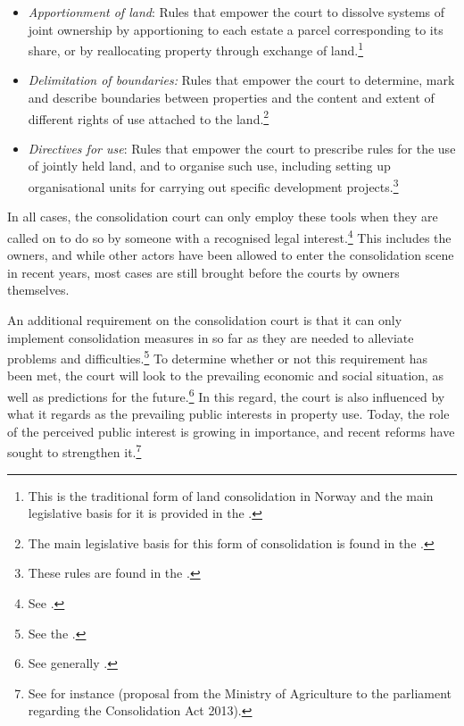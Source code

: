 \begin{itemize}
\item \emph{Apportionment of land}: Rules that empower the court to dissolve systems of joint ownership by apportioning to each estate a parcel corresponding to its share, or by reallocating property through exchange of land.\footnote{This is the traditional form of land consolidation in Norway and the main legislative basis for it is provided in the \cite[2 a)-b)]{lca79}.}
\item \emph{Delimitation of boundaries:} Rules that empower the court to determine, mark and describe boundaries between properties and the content and extent of different rights of use attached to the land.\footnote{The main legislative basis for this form of consolidation is found in the \cite[88]{lca79}.}
\item \emph{Directives for use}: Rules that empower the court to prescribe rules for the use of jointly held land, and to organise such use, including setting up organisational units for carrying out specific development projects.\footnote{These rules are found in the \cite[2 c)|34-35]{lca79}.}
\end{itemize}

In all cases, the consolidation court can only employ these tools when they are called on to do so by someone with a recognised legal interest.\footnote{See \cite[5]{lca79}.} This includes the owners, and while other actors have been allowed to enter the consolidation scene in recent years, most cases are still brought before the courts by owners themselves.

An additional requirement on the consolidation court is that it can only implement consolidation measures in so far as they are needed to alleviate problems and difficulties.\footnote{See the \cite[1]{lca79}.} To determine whether or not this requirement has been met, the court will look to the prevailing economic and social situation, as well as predictions for the future.\footnote{See generally \cite{reiten09}.} In this regard, the court is also influenced by what it regards as the prevailing public interests in property use. Today, the role of the perceived public interest is growing in importance, and recent reforms have sought to strengthen it.\footnote{See for instance \cite{prop12} (proposal from the Ministry of Agriculture to the parliament regarding the Consolidation Act 2013).}

